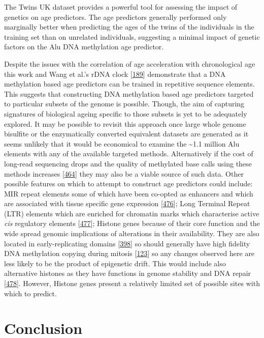 \documentclass[
]{book}
\begin{document}
The Twins UK dataset provides a powerful tool for assessing the impact of genetics on age predictors.
The age predictors generally performed only marginally better when predicting the ages of the twins of the individuals in the training set than on unrelated individuals, suggesting a minimal impact of genetic factors on the Alu DNA methylation age predictor.

Despite the issues with the correlation of age acceleration with chronological age this work and Wang et al.'s rDNA clock {[}\protect\hyperlink{ref-Wang2019}{189}{]} demonstrate that a DNA methylation based age predictors can be trained in repetitive sequence elements.
This suggests that constructing DNA methylation based age predictors targeted to particular subsets of the genome is possible.
Though, the aim of capturing signatures of biological ageing specific to those subsets is yet to be adequately explored.
It may be possible to revisit this approach once large whole genome bisulfite or the enzymatically converted equivalent datasets are generated as it seems unlikely that it would be economical to examine the \textasciitilde1.1 million Alu elements with any of the available targeted methods.
Alternatively if the cost of long-read sequencing drops and the quality of methylated base calls using these methods increases {[}\protect\hyperlink{ref-Ni2019}{464}{]} they may also be a viable source of such data.
Other possible features on which to attempt to construct age predictors could include: MIR repeat elements some of which have been co-opted as enhancers and which are associated with tissue specific gene expression {[}\protect\hyperlink{ref-Jjingo2014}{476}{]}; Long Terminal Repeat (LTR) elements which are enriched for chromatin marks which characterise active \emph{cis} regulatory elements {[}\protect\hyperlink{ref-Leung2015}{477}{]}; Histone genes because of their core function and the wide spread genomic implications of alterations in their availability. They are also located in early-replicating domains {[}\protect\hyperlink{ref-Muller2017}{398}{]} so should generally have high fidelity DNA methylation copying during mitosis {[}\protect\hyperlink{ref-Zhou2018}{123}{]} so any changes observed here are less likely to be the product of epigenetic drift. This would include also alternative histones as they have functions in genome stability and DNA repair {[}\protect\hyperlink{ref-Billon2012}{478}{]}. However, Histone genes present a relatively limited set of possible sites with which to predict.

\hypertarget{conclusion}{%
\section{Conclusion}\label{conclusion}}
\end{document}
